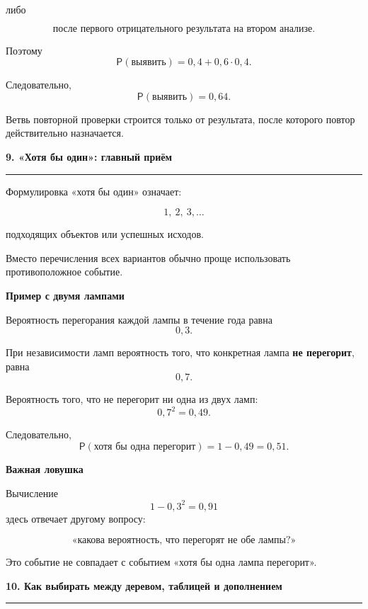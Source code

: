 \documentclass[a4paper,12pt]{article}
\newcommand{\Prob}{\mathsf{P}}
\newcommand{\topichead}[1]{%
  \vspace{0.5em}
  {\Large\bfseries\color{darkaccent}#1\par}
  \vspace{0.35em}
  {\color{accent}\rule{\linewidth}{0.7pt}}
  \vspace{0.5em}
}
\newcommand{\subtopic}[1]{%
  \vspace{0.4em}
  {\large\bfseries\color{darkaccent}#1\par}
  \vspace{0.15em}
}
\begin{document}
либо

\[
\text{после первого отрицательного результата на втором анализе}.
\]

Поэтому
\[
\Prob(\text{выявить})
=
0{,}4
+
0{,}6\cdot0{,}4.
\]

Следовательно,
\[
\boxed{
\Prob(\text{выявить})=0{,}64
}.
\]

Ветвь повторной проверки строится только от результата, после которого
повтор действительно назначается.


\topichead{9. «Хотя бы один»: главный приём}

Формулировка «хотя бы один» означает:

\[
1,\ 2,\ 3,\ldots
\]

подходящих объектов или успешных исходов.

Вместо перечисления всех вариантов обычно проще использовать
противоположное событие.

\subtopic{Пример с двумя лампами}

Вероятность перегорания каждой лампы в течение года равна
\[
0{,}3.
\]

При независимости ламп вероятность того, что конкретная лампа
\textbf{не перегорит}, равна
\[
0{,}7.
\]

Вероятность того, что не перегорит ни одна из двух ламп:
\[
0{,}7^2=0{,}49.
\]

Следовательно,
\[
\boxed{
\Prob(\text{хотя бы одна перегорит})
=
1-0{,}49
=
0{,}51
}.
\]

\subtopic{Важная ловушка}

Вычисление
\[
1-0{,}3^2=0{,}91
\]
здесь отвечает другому вопросу:

\[
\text{«какова вероятность, что перегорят не обе лампы?»}
\]

Это событие не совпадает с событием
«хотя бы одна лампа перегорит».


\topichead{10. Как выбирать между деревом, таблицей и дополнением}
\end{document}
